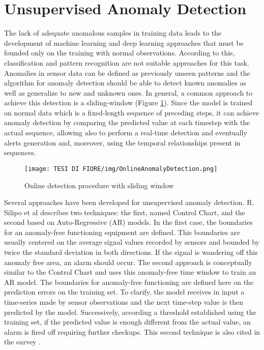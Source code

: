 \section{Unsupervised Anomaly Detection}
The lack of adequate anomalous samples in training data leads to the development of machine learning and deep learning approaches that must be founded only on the training with normal observations. According to this, classification and pattern recognition are not suitable approaches for this task. Anomalies in sensor data can be defined as previously unseen patterns and the algorithm for anomaly detection should be able to detect known anomalies as well as generalize to new and unknown ones. In general, a common approach to achieve this detection is a sliding-window (Figure \ref{anomaly_detection_with_sliding_window}). Since the model is trained on normal data which is a fixed-length sequence of preceding steps, it can achieve anomaly detection by comparing the predicted value at each timestep with the actual sequence, allowing also to perform a real-time detection and eventually alerts generation \cite{9UnsupervisedOnlineAnomalyDetectionMultivariate} and, moreover, using the temporal relationships present in sequences.
\begin{figure}[ht]
\texttt{[image: TESI DI FIORE/img/OnlineAnomalyDetection.png]}
\centering
\caption{Online detection procedure with sliding window \cite{9UnsupervisedOnlineAnomalyDetectionMultivariate}}
\label{anomaly_detection_with_sliding_window}
\end{figure}
Several approaches have been developed for unsupervised anomaly detection. R. Silipo et al \cite{8AnomalyDetectionUnsupervised2} describes two techniques: the first, named Control Chart, and the second based on Auto-Regressive (AR) models. In the first case, the boundaries for an anomaly-free functioning equipment are defined. This boundaries are usually centered on the average signal values recorded by sensors and bounded by twice the standard deviation in both directions. If the signal is wandering off this anomaly free area, an alarm should occur. The second approach is conceptually similar to the Control Chart and uses this anomaly-free time window to train an AR model. The boundaries for anomaly-free functioning are defined here on the prediction errors on the training set. To clarify, the model receives in input a time-series made by sensor observations and the next time-step value is then predicted by the model. Successively, according a threshold established using the training set, if the predicted value is enough different from the actual value, an alarm is fired off requiring further checkups. This second technique is also cited in the survey \cite{6AnomalyIoTTimeSeries}.\\
